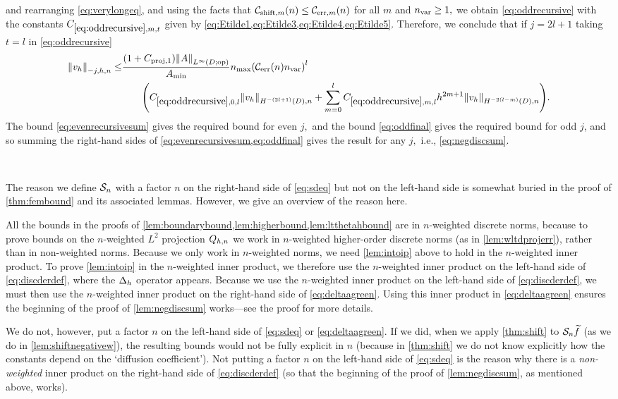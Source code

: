 and rearranging \cref{eq:verylongeq}, and using the facts that $\shiftn{m} \leq \errn{m}$ for all $m$ and $n_{\mathrm{var}} \geq 1,$ we obtain \cref{eq:oddrecursive} with the constants $\Etildefn{m,t}$ given by \cref{eq:Etilde1,eq:Etilde3,eq:Etilde4,eq:Etilde5}. Therefore, we conclude that if $j = 2l+1$ taking $t=l$ in \cref{eq:oddrecursive}
\begin{align}
  \Nfn{-j,h,n}{\vh} \leq& \frac{\mleft(1+\Cprojfn{1}\mright)\NLiDop{A}}{\Amin}\nmax\mleft(\En \nvar\mright)^{l}\nonumber\\
  &\quad\quad\mleft(\Etildefn{0,l} \NHnfn{-(2l+1)}{D}{\vh} + \sum_{m=0}^{l} \Etildefn{m,l} h^{2m+1}  \NHnfn{-2(l-m)}{D}{\vh}\mright).\label{eq:oddfinal}
\end{align}
The bound \cref{eq:evenrecursivesum} gives the required bound for even $j,$ and the bound \cref{eq:oddfinal} gives the required bound for odd $j$,  and so summing the right-hand sides of \cref{eq:evenrecursivesum,eq:oddfinal} gives the result for any $j,$ i.e., \cref{eq:negdiscsum}.
\epf

\label{rem:why}

\

The reason we define $\mathcal S_{n}$ with a factor $n$ on the right-hand side of \cref{eq:sdeq} but not on the left-hand side is somewhat buried in the proof of \cref{thm:fembound} and its associated lemmas. However, we give an overview of the reason here.

All the bounds in the proofs of \cref{lem:boundarybound,lem:higherbound,lem:ltthetahbound} are in $n$-weighted discrete norms, because to prove bounds on the $n$-weighted $L^2$ projection $Q_{h,n}$ we work in $n$-weighted higher-order discrete norms (as in \cref{lem:wltdprojerr}), rather than in non-weighted norms. Because we only work in $n$-weighted norms, we need \cref{lem:intoip} above to hold in the $n$-weighted inner product. To prove \cref{lem:intoip} in the $n$-weighted inner product, we therefore use the $n$-weighted inner product on the left-hand side of \cref{eq:discderdef}, where the $\Delta_{h}$ operator appears. Because we use the $n$-weighted inner product on the left-hand side of \cref{eq:discderdef}, we must then use the $n$-weighted inner product on the right-hand side of \cref{eq:deltaagreen}. Using this inner product in \cref{eq:deltaagreen} ensures the beginning of the proof of \cref{lem:negdiscsum} works---see the proof for more details.

We do not, however, put a factor $n$ on the left-hand side of \cref{eq:sdeq} or \cref{eq:deltaagreen}. If we did, when we apply \cref{thm:shift} to $\mathcal S_{n} \widetilde{f}$ (as we do in \cref{lem:shiftnegativew}), the resulting bounds would not be fully explicit in $n$ (because in \cref{thm:shift} we do not know explicitly how the constants depend on the `diffusion coefficient'). Not putting a factor $n$ on the left-hand side of \cref{eq:sdeq} is the reason why there is a \emph{non-weighted} inner product on the right-hand side of \cref{eq:discderdef} (so that the beginning of the proof of \cref{lem:negdiscsum}, as mentioned above, works).
\ere

